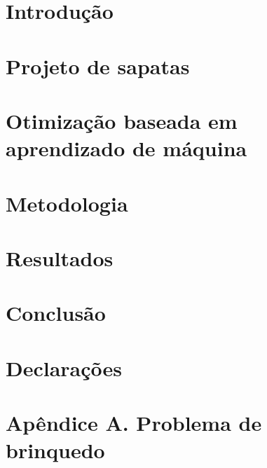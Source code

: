 \documentclass[preprint,11pt]{elsarticle}
\theoremstyle{plain}
\theoremstyle{definition}
\theoremstyle{remark}
\begin{document}
\linenumbers

\section{Introdução}
\label{sec:intro}


\section{Projeto de sapatas}\label{sec:sapata}
\section{Otimização baseada em aprendizado de máquina}\label{sec:ego}
\section{Metodologia}\label{sec:method}
\section{Resultados}\label{sec:results}
\section{Conclusão}

\section*{Declarações}


\section*{Apêndice A. Problema de brinquedo}\label{apendix}



\end{document}
